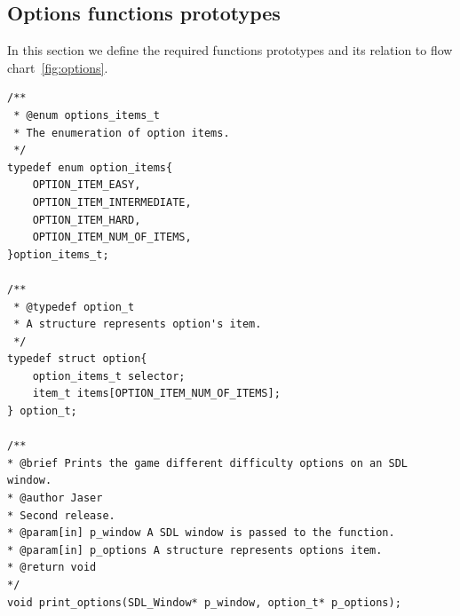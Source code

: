 \subsection{Options functions prototypes}

In this section we define the required functions prototypes and its relation to flow chart~\ref{fig:options}.

\begin{verbatim}
/**
 * @enum options_items_t
 * The enumeration of option items.
 */
typedef enum option_items{
    OPTION_ITEM_EASY,
    OPTION_ITEM_INTERMEDIATE,
    OPTION_ITEM_HARD,
    OPTION_ITEM_NUM_OF_ITEMS,
}option_items_t;

/**
 * @typedef option_t
 * A structure represents option's item.
 */
typedef struct option{
    option_items_t selector;
    item_t items[OPTION_ITEM_NUM_OF_ITEMS];
} option_t;

/**
* @brief Prints the game different difficulty options on an SDL window.
* @author Jaser
* Second release.
* @param[in] p_window A SDL window is passed to the function.
* @param[in] p_options A structure represents options item.
* @return void
*/
void print_options(SDL_Window* p_window, option_t* p_options);
\end{verbatim}